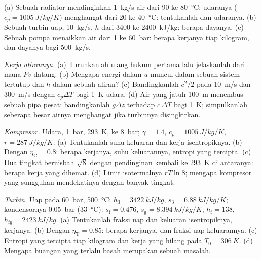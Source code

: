 \begin{exercise}[$\star$]\label{exo:b2:open-systems:4}
(a) Sebuah radiator mendinginkan \qty{1}{kg/s} air dari \qty{90}{} ke \qty{80}{\celsius};
udaranya ($c_p = \qty{1005}{J/kg/K}$) menghangat dari \qty{20}{} ke \qty{40}{\celsius}:
tentukanlah  dan  udaranya. (b) Sebuah turbin uap, \qty{10}{kg/s},
$h$ dari \qty{3400}{} ke \qty{2400}{kJ/kg}: berapa dayanya. (c) Sebuah pompa menaikkan
air dari \qty{1}{} ke \qty{60}{bar}: berapa kerjanya tiap kilogram, dan dayanya bagi
\qty{500}{kg/s}.
\end{exercise}

\begin{exercise}[$\star\star$]\label{exo:b2:open-systems:5}
\emph{Kerja alirannya.} (a) Turunkanlah ulang hukum pertama  lalu
jelaskanlah dari mana $Pv$ datang. (b) Mengapa energi dalam $u$
muncul dalam sebuah sistem tertutup dan $h$ dalam sebuah aliran? (c) Bandingkanlah $c^2/2$ pada
\qty{10}{m/s} dan \qty{300}{m/s} dengan $c_p\Delta T$ bagi \qty{1}{K} udara.
(d) Air yang jatuh \qty{100}{m} menembus sebuah pipa pesat: bandingkanlah $g\Delta z$ terhadap
$c\,\Delta T$ bagi \qty{1}{K}; simpulkanlah seberapa besar airnya menghangat jika
turbinnya disingkirkan.
\end{exercise}

\begin{exercise}[$\star\star$]\label{exo:b2:open-systems:6}
\emph{Kompresor.} Udara, \qty{1}{bar}, \qty{293}{K}, ke \qty{8}{bar}; $\gamma =
1.4$, $c_p = \qty{1005}{J/kg/K}$, $r = \qty{287}{J/kg/K}$. (a) Tentukanlah suhu
keluaran dan kerja isentropiknya. (b) Dengan $\eta_{\text{C}} = 0.8$: berapa kerjanya, suhu
keluarannya, entropi yang tercipta. (c) Dua tingkat bernisbah $\sqrt8$ dengan
pendinginan kembali ke \qty{293}{K} di antaranya: berapa kerja yang dihemat. (d) Limit
isotermalnya $rT\ln 8$; mengapa kompresor yang sungguhan mendekatinya dengan banyak tingkat.
\end{exercise}

\begin{exercise}[$\star\star$]\label{exo:b2:open-systems:7}
\emph{Turbin.} Uap pada \qty{60}{bar}, \qty{500}{\celsius}: $h_3 = \qty{3422}{kJ/kg}$,
$s_3 = \qty{6.88}{kJ/kg/K}$; kondensornya \qty{0.05}{bar} (\qty{33}{\celsius}):
$s_{\text{f}} = 0.476$, $s_{\text{g}} = \qty{8.394}{kJ/kg/K}$, $h_{\text{f}} = 138$,
$h_{\text{fg}} = \qty{2423}{kJ/kg}$. (a) Tentukanlah fraksi uap dan  keluaran
isentropiknya, kerjanya. (b) Dengan $\eta_{\text{T}} = 0.85$: berapa kerjanya,  dan fraksi
uap keluarannya. (c) Entropi yang tercipta tiap kilogram dan kerja yang hilang pada $T_0 =
\qty{306}{K}$. (d) Mengapa buangan yang terlalu basah merupakan sebuah masalah.
\end{exercise}

